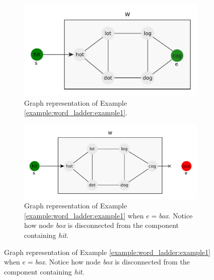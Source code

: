 \begin{figure}
	\centering
	\begin{subfigure}[]{0.95\textwidth}
		\includegraphics[width=\textwidth]{sources/word_ladder/images/example1}
		\caption[n]{Graph representation of Example \ref{example:word_ladder:example1}.}
		\label{fig:word_ladder:example1}
	 \end{subfigure}
	\hfill
	\begin{subfigure}[]{1.17\textwidth}
		\includegraphics[width=\textwidth]{sources/word_ladder/images/example2}
		\caption[n]{Graph representation of Example \ref{example:word_ladder:example1} when $e=$\textit{box}. Notice how node \textit{box} is disconnected from the component containing \textit{hit}.}
		\label{fig:word_ladder:example1}
	\end{subfigure}
\end{figure}
    




